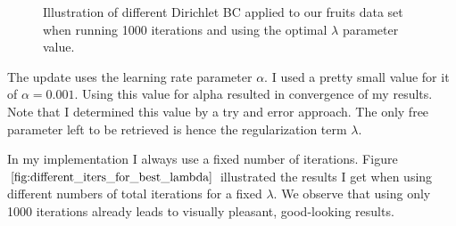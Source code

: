 \documentclass{paper}
\begin{document}
\begin{figure}[H]
\begin{center}
{   \label{fig:subfig11113}
 }
\end{center}
\caption{Illustration of different Dirichlet BC applied to our fruits data set when running 1000 iterations and using the optimal $\lambda$ parameter value.}
\label{fig:diff_dirichlet_bc}
\end{figure}

The update uses the learning rate parameter $\alpha$. I used a pretty small value for it of $\alpha=0.001$. Using this value for alpha resulted in convergence of my results. Note that I determined this value by a try and error approach. The only free parameter left to be retrieved is hence the regularization term $\lambda$.

In my implementation I always use a fixed number of iterations. Figure $\ref{fig:different_iters_for_best_lambda}$ illustrated the results I get when using different numbers of total iterations for a fixed $\lambda$. We observe that using only 1000 iterations already leads to visually pleasant, good-looking results.
\end{document}
